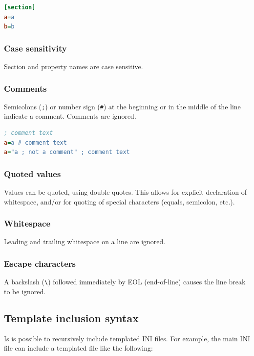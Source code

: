 \documentclass[a4paper,11pt,oneside]{article}
\begin{document}
\begin{lstlisting}[language=ini]
[section]
a=a
b=b
\end{lstlisting}

\subsubsection{Case sensitivity}

Section and property names are case sensitive.

\subsubsection{Comments}

Semicolons (\lstinline!;!) or number sign (\lstinline!#!) at the beginning or in
 the middle of the line indicate a comment. Comments are ignored.

\begin{lstlisting}[language=ini]
; comment text
a=a # comment text
a="a ; not a comment" ; comment text
\end{lstlisting}

\subsubsection{Quoted values}

Values can be quoted, using double quotes. This allows for explicit declaration
of whitespace, and/or for quoting of special characters (equals, semicolon,
etc.).

\subsubsection{Whitespace}

Leading and trailing whitespace on a line are ignored.

\subsubsection{Escape characters}

A backslash (\lstinline!\!) followed immediately by EOL (end-of-line) causes the
 line break to be ignored.

\subsection{Template inclusion syntax}

Is is possible to recursively include templated INI files. For example, the main
INI file can include a templated file like the following:
\end{document}
